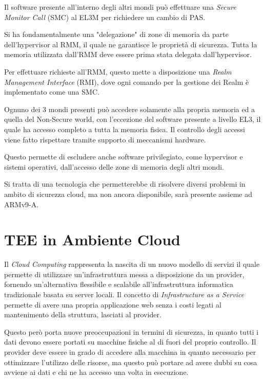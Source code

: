 \documentclass[12pt,italian]{report}
\begin{document}
	Il software presente all'interno degli altri mondi può effettuare una \textit{Secure Monitor Call} (SMC) al EL3M per richiedere un cambio di PAS.

	\bigbreak

	Si ha fondamentalmente una "delegazione" di zone di memoria da parte dell'hypervisor al RMM, il quale ne garantisce le proprietà di sicurezza. Tutta la memoria utilizzata dall'RMM deve essere prima stata delegata dall'hypervisor.
	
	Per effettuare richieste all'RMM, questo mette a disposizione una \textit{Realm Management Interface} (RMI), dove ogni comando per la gestione dei Realm è implementato come una SMC.

	\bigbreak

	Ognuno dei 3 mondi presenti può accedere solamente alla propria memoria ed a quella del Non-Secure world, con l'eccezione del software presente a livello EL3, il quale ha accesso completo a tutta la memoria fisica. Il controllo degli accessi viene fatto rispettare tramite supporto di meccanismi hardware.

	Questo permette di escludere anche software privilegiato, come hypervisor e sistemi operativi, dall'accesso delle zone di memoria degli altri mondi.

	\bigbreak

	Si tratta di una tecnologia che permetterebbe di risolvere diversi problemi in ambito di sicurezza cloud, ma non ancora disponibile, sarà presente assieme ad ARMv9-A.

	\chapter{TEE in Ambiente Cloud}
	\label{cap:problema}
	Il \textit{Cloud Computing} rappresenta la nascita di un nuovo modello di servizi il quale permette di utilizzare un'infrastruttura messa a disposizione da un provider, fornendo un'alternativa flessibile e scalabile all'infrastruttura informatica tradizionale basata su server locali. Il concetto di \textit{Infrastructure as a Service} permette di avere una propria applicazione web senza i costi legati al mantenimento della struttura, lasciati al provider.
	
	\bigbreak
	
	Questo però porta nuove preoccupazioni in termini di sicurezza, in quanto tutti i dati devono essere portati su macchine fisiche al di fuori del proprio controllo. Il provider deve essere in grado di accedere alla macchina in quanto necessario per ottimizzare l'utilizzo delle risorse, ma questo può portare ad avere dubbi su cosa avviene ai dati e chi ne ha accesso una volta in esecuzione.
	
\end{document}
